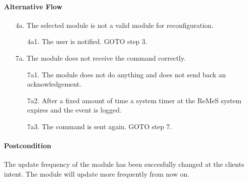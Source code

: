 \paragraph{Alternative Flow}
\begin{enumerate}
	\item[4a.] The selected module is not a valid module for reconfiguration. 
	\begin{enumerate}
		\item[4a1.] The user is notified. GOTO step 3.
	\end{enumerate}
	\item[7a.] The module does not receive the command correctly. 
	\begin{enumerate}
		\item[7a1.] The module does not do anything and does not send back an acknowledgement.
		\item[7a2.] After a fixed amount of time a system timer at the ReMeS system expires and the event is logged.
		\item[7a3.] The command is sent again. GOTO step 7.  
	\end{enumerate}
\end{enumerate}

\paragraph{Postcondition}
The update frequency of the module has been succesfully changed at the clients intent. 
The module will update more frequently from now on.
